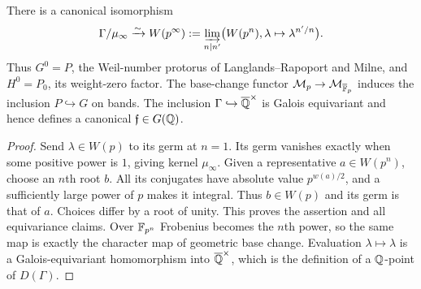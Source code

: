 \begin{proposition}
\label{A:P}
There is a canonical isomorphism
\[
 \Gamma/\mu_\infty\xrightarrow{\sim}
 W(p^\infty):=\varinjlim_{n\mid n'}
   \bigl(W(p^n),\lambda\mapsto\lambda^{n'/n}\bigr).
\]
Thus $G^0=P$, the Weil-number protorus of Langlands--Rapoport and
Milne, and $H^0=P_0$, its weight-zero factor. The base-change
functor $\mathcal M_p\to\mathcal M_{\overline{\mathbb F}_p}$ induces
the inclusion $P\hookrightarrow G$ on bands. The inclusion
$\Gamma\hookrightarrow\overline{\mathbb Q}^\times$ is Galois equivariant
and hence defines a canonical $\mathfrak f\in G(\mathbb Q)$.
\end{proposition}
\begin{proof}
Send $\lambda\in W(p)$ to its germ at $n=1$. Its germ vanishes
exactly when some positive power is $1$, giving kernel
$\mu_\infty$. Given a representative $a\in W(p^n)$, choose an
$n$th root $b$. All its conjugates have absolute value $p^{w(a)/2}$,
and a sufficiently large power of $p$ makes it integral. Thus
$b\in W(p)$ and its germ is that of $a$. Choices differ by a root
of unity. This proves the assertion and all equivariance claims.
Over $\mathbb F_{p^n}$ Frobenius becomes the $n$th power, so the same
map is exactly the character map of geometric base change.
Evaluation $\lambda\mapsto\lambda$ is a Galois-equivariant
homomorphism into $\overline{\mathbb Q}^\times$, which is the definition
of a $\mathbb Q$-point of $D(\Gamma)$.
\end{proof}

